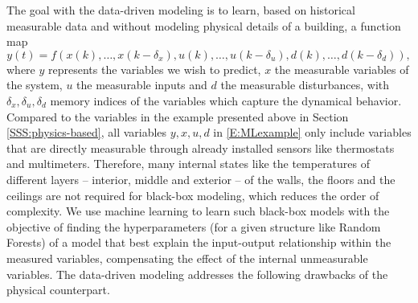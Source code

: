 \textcolor[rgb]{0,0,1}{The goal with the data-driven modeling is to learn, based on historical measurable data and without modeling physical details of a building, a function map
\begin{equation}\label{E:MLexample}
	y(t) = f(x(k),\ldots,x(k-\delta_x), u(k),\dots,u(k-\delta_u), d(k),\dots, d(k-\delta_d)),
\end{equation}
where \(y\) represents the variables we wish to predict, \(x\) the measurable variables of the system, \(u\) the measurable inputs and \(d\) the measurable disturbances, with $\delta_x, \delta_u, \delta_d$ memory indices of the variables which capture the dynamical behavior. Compared to the variables in the example presented above in Section \ref{SSS:physics-based}, all variables $y,x,u,d$ in \eqref{E:MLexample} only include variables that are directly measurable through already installed sensors like thermostats and multimeters.
Therefore, many internal states like the temperatures of different layers -- interior, middle and exterior -- of the walls, the floors and the ceilings are not required for black-box modeling, which reduces the order of complexity.
We use machine learning to learn such black-box models with the objective of finding the hyperparameters (for a given structure like Random Forests) of a model that best explain the input-output relationship within the measured variables, compensating the effect of the internal unmeasurable variables. The data-driven modeling addresses the following drawbacks of the physical counterpart.}
